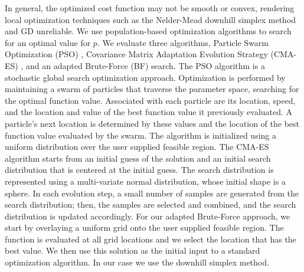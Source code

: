 \documentclass[]{spie}  %
\begin{document}
In general, the optimized cost function may not be smooth or convex,
rendering local optimization techniques such as the Nelder-Mead downhill
simplex method and GD unreliable. We use population-based optimization
algorithms to search for an optimal value for $p$. We evaluate three
algorithms, Particle Swarm Optimization (PSO) \cite{Kennedy95:NN}, Covariance
Matrix Adaptation Evolution Strategy (CMA-ES) \cite{Hansen06}, and an adapted
Brute-Force (BF) search. The PSO algorithm is a stochastic global search
optimization approach. Optimization is performed by maintaining a swarm of
particles that traverse the parameter space, searching for the optimal
function value. Associated with each particle are its location, speed, and
the location and value of the best function value it previously evaluated. A
particle's next location is determined by these values and the location of
the best function value evaluated by the swarm. The algorithm is initialized
using a uniform distribution over the user supplied feasible region. The
CMA-ES algorithm starts from an initial guess of the solution and an initial
search distribution that is centered at the initial guess. The search
distribution is represented using a multi-variate normal distribution, whose
initial shape is a sphere. In each evolution step, a small number of samples
are generated from the search distribution; then, the samples are selected
and combined, and the search distribution is updated accordingly. For our
adapted Brute-Force approach, we start by overlaying a uniform grid onto the
user supplied feasible region. The function is evaluated at all grid
locations and we select the location that has the best value. We then use
this solution as the initial input to a standard optimization algorithm. In
our case we use the downhill simplex method.


\end{document}
